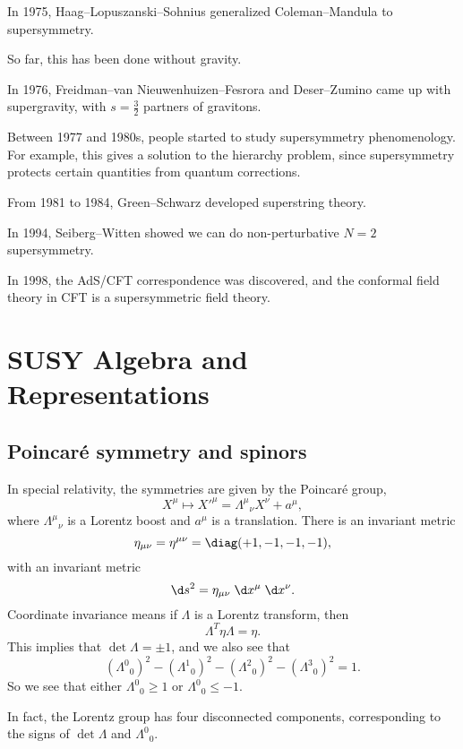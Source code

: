\documentclass[a4paper]{article}
\begin{document}
In 1975, Haag--Lopuszanski--Sohnius generalized Coleman--Mandula to supersymmetry.

So far, this has been done without gravity.

In 1976, Freidman--van Nieuwenhuizen--Fesrora and Deser--Zumino came up with supergravity, with $s = \frac{3}{2}$ partners of gravitons.

Between 1977 and 1980s, people started to study supersymmetry phenomenology. For example, this gives a solution to the hierarchy problem, since supersymmetry protects certain quantities from quantum corrections.

From 1981 to 1984, Green--Schwarz developed superstring theory.


In 1994, Seiberg--Witten showed we can do non-perturbative $N = 2$ supersymmetry.


In 1998, the AdS/CFT correspondence was discovered, and the conformal field theory in CFT is a supersymmetric field theory.
\section{SUSY Algebra and Representations}
\subsection{Poincar\'e symmetry and spinors} %
In special relativity, the symmetries are given by the Poincar\'e group,
\[
  X^\mu \mapsto X'^\mu = \Lambda^\mu\!_\nu X^\nu + a^\mu,
\]
where $\Lambda^\mu\!_\nu$ is a Lorentz boost and $a^\mu$ is a translation. There is an invariant metric
\[
  \eta_{\mu\nu} = \eta^{\mu\nu} = \diag(+1, -1, -1, -1),
\]
with an invariant metric
\[
  \d s^2 = \eta_{\mu\nu}\;\d x^\mu\;\d x^\nu.
\]
Coordinate invariance means if $\Lambda$ is a Lorentz transform, then
\[
  \Lambda^T \eta \Lambda = \eta.
\]
This implies that $\det \Lambda = \pm 1$, and we also see that %
\[
  (\Lambda^0\!_0)^2 - (\Lambda^1\!_0)^2 - (\Lambda^2\!_0)^2 - (\Lambda^3\!_0)^2 = 1.
\]
So we see that either $\Lambda^0\!_0 \geq 1$ or $\Lambda^0\!_0 \leq -1$.

In fact, the Lorentz group has four disconnected components, corresponding to the signs of $\det \Lambda$ and $\Lambda^0\!_0$. %
\end{document}
